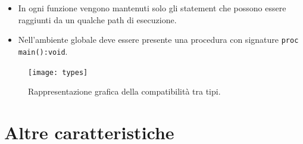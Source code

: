 \documentclass{report}
\begin{document}
\begin {itemize}
    \item In ogni funzione vengono mantenuti solo gli statement che possono essere raggiunti
    da un qualche path di esecuzione.

    \item Nell'ambiente globale deve essere presente una procedura con signature
        \texttt{proc main():void}.

\end {itemize}

\begin{figure}[H]
\centering
\texttt{[image: types]}
\caption {Rappresentazione grafica della compatibilità tra tipi.}
\end{figure}

\section {Altre caratteristiche}
\end{document}
